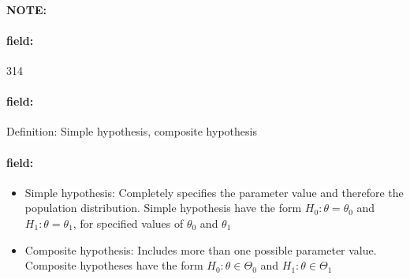 \documentclass[12pt]{article}
\newenvironment{note}{\paragraph{NOTE:}}{}
\newenvironment{field}{\paragraph{field:}}{}
\begin{document}
\begin{note}
    \begin{field}
        \tiny 314
    \end{field}
    \begin{field}
        Definition: Simple hypothesis, composite hypothesis
    \end{field}
    \begin{field}
        \begin{itemize}
          \item Simple hypothesis: Completely specifies the parameter value and therefore the population distribution. Simple hypothesis have the form $H_0: \theta = \theta_0$ and $H_1: \theta = \theta_1$, for specified values of $\theta_0$ and $\theta_1$
          \item Composite hypothesis: Includes more than one possible parameter value. Composite hypotheses have the form $H_0: \theta \in \Theta_0$ and $H_1: \theta \in \Theta_1$
        \end{itemize}
    \end{field}
\end{note}
\end{document}
